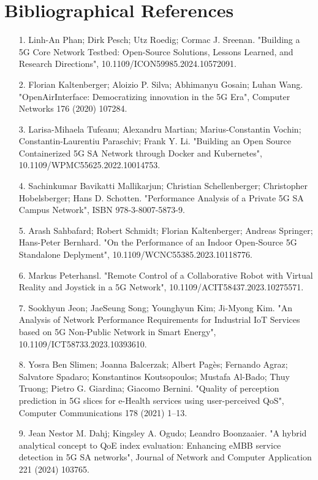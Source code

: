 \documentclass{report}
\begin{document}
\chapter{Bibliographical References}
\begin{itemize}
	\item[1.] Linh-An Phan; Dirk Pesch; Utz Roedig; Cormac J. Sreenan. "Building a 5G Core Network Testbed: Open-Source Solutions, Lessons Learned, and Research Directions", 10.1109/ICON59985.2024.10572091.
	\item[2.] Florian Kaltenberger; Aloizio P. Silva; Abhimanyu Gosain; Luhan Wang. "OpenAirInterface: Democratizing innovation in the 5G Era", Computer Networks 176 (2020) 107284.
	\item[3.] Larisa-Mihaela Tufeanu; Alexandru Martian; Marius-Constantin Vochin; Constantin-Laurentiu Paraschiv; Frank Y. Li. "Building an Open Source Containerized 5G SA Network through Docker and Kubernetes", 10.1109/WPMC55625.2022.10014753.
	\item[4.] Sachinkumar Bavikatti Mallikarjun; Christian Schellenberger; Christopher Hobelsberger; Hans D. Schotten. "Performance Analysis of a Private 5G SA Campus Network", ISBN 978-3-8007-5873-9.
	\item[5.] Arash Sahbafard; Robert Schmidt; Florian Kaltenberger; Andreas Springer; Hans-Peter Bernhard. "On the Performance of an Indoor Open-Source 5G Standalone Deplyment", 10.1109/WCNC55385.2023.10118776.
	\item[6.] Markus Peterhansl. "Remote Control of a Collaborative Robot with Virtual Reality and Joystick in a 5G Network", 10.1109/ACIT58437.2023.10275571.
	\item[7.] Sookhyun Jeon; JaeSeung Song; Younghyun Kim; Ji-Myong Kim. "An Analysis of Network Performance Requirements for Industrial IoT Services based on 5G Non-Public Network in Smart Energy",\\ 10.1109/ICT58733.2023.10393610.
	\item[8.] Yosra Ben Slimen; Joanna Balcerzak; Albert Pagès; Fernando Agraz; Salvatore Spadaro;
	Konstantinos Koutsopoulos; Mustafa Al-Bado; Thuy Truong; Pietro G. Giardina; Giacomo Bernini. "Quality of perception prediction in 5G slices for e-Health services using user-perceived QoS", Computer Communications 178 (2021) 1–13.
	\item[9.] Jean Nestor M. Dahj; Kingsley A. Ogudo; Leandro Boonzaaier. "A hybrid analytical concept to QoE index evaluation: Enhancing eMBB service detection in 5G SA networks", Journal of Network and Computer Application 221 (2024) 103765.

\end{itemize}
\end{document}
